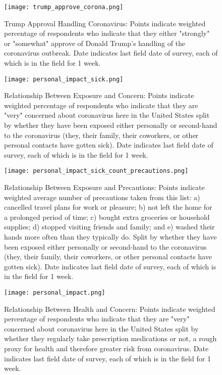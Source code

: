 \documentclass[landscape]{article}
\begin{document}
\begin{figure}
\begin{center}
\texttt{[image: trump\_approve\_corona.png]}
\end{center}
\caption{Trump Approval Handling Coronavirus: Points indicate weighted percentage of respondents who indicate that they either "strongly" or "somewhat" approve of Donald Trump's handling of the coronavirus outbreak. Date indicates last field date of survey, each of which is in the field for 1 week.}
\end{figure}

\begin{figure}
\begin{center}
\texttt{[image: personal\_impact\_sick.png]}
\end{center}
\caption{Relationship Between Exposure and Concern: Points indicate weighted percentage of respondents who indicate that they are "very" concerned about coronavirus here in the United States split by whether they have been exposed either personally or second-hand to the coronavirus (they, their family, their coworkers, or other personal contacts have gotten sick). Date indicates last field date of survey, each of which is in the field for 1 week.}
\end{figure}

\begin{figure}
\begin{center}
\texttt{[image: personal\_impact\_sick\_count\_precautions.png]}
\end{center}
\caption{Relationship Between Exposure and Precautions: Points indicate weighted average number of precautions taken from this list: a) cancelled travel plans for work or pleasure; b) not left the home for a prolonged period of time; c) bought extra groceries or household supplies; d) stopped visiting friends and family; and e) washed their hands more often than they typically do. Split by whether they have been exposed either personally or second-hand to the coronavirus (they, their family, their coworkers, or other personal contacts have gotten sick). Date indicates last field date of survey, each of which is in the field for 1 week.}
\end{figure}

\begin{figure}
\begin{center}
\texttt{[image: personal\_impact.png]}
\end{center}
\caption{Relationship Between Health and Concern: Points indicate weighted percentage of respondents who indicate that they are "very" concerned about coronavirus here in the United States split by whether they regularly take prescription medications or not, a rough proxy for health and therefore greater risk from coronavirus. Date indicates last field date of survey, each of which is in the field for 1 week.}
\end{figure}
\end{document}

